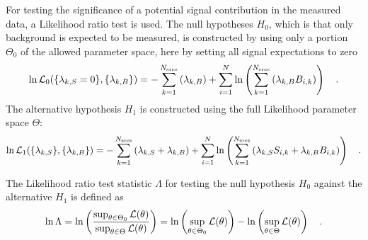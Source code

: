 For testing the significance of a potential signal contribution in the measured data, a Likelihood ratio test is used.
The null hypotheses $H_0$, which is that only background is expected to be measured, is constructed by using only a portion $\Theta_0$ of the allowed parameter space, here by setting all signal expectations to zero
\begin{equation}
  \ln\mathcal{L}_0(\{\lambda_{k,S}=0\}, \{\lambda_{k,B}\})
  = -\sum_{k=1}^{N_\text{srcs}}\left(\lambda_{k,B}\right) +
    \sum_{i=1}^N \ln\left(\sum_{k=1}^{N_\text{srcs}}\left(
      \lambda_{k,B} B_{i,k}\right)\right)
  \quad\text{.}
\end{equation}
The alternative hypothesis $H_1$ is constructed using the full Likelihood parameter space $\Theta$:
\begin{equation}
  \ln\mathcal{L}_1(\{\lambda_{k,S}\}, \{\lambda_{k,B}\})
  = -\sum_{k=1}^{N_\text{srcs}}\left(\lambda_{k,S}+
                                     \lambda_{k,B}\right) +
    \sum_{i=1}^N \ln\left(\sum_{k=1}^{N_\text{srcs}}\left(
      \lambda_{k,S} S_{i,k}+\lambda_{k,B} B_{i,k}\right)\right)
  \quad\text{.}
\end{equation}

The Likelihood ratio test statistic $\Lambda$ for testing the null hypothesis $H_0$ against the alternative $H_1$ is defined as 
\begin{equation}
  \ln\Lambda = \ln\left(\frac{\sup_{\theta \in \Theta_0} \mathcal{L}(\theta)}
                          {\sup_{\theta \in \Theta} \mathcal{L}(\theta)}\right)
  = \ln\left(\sup_{\theta \in \Theta_0} \mathcal{L}(\theta)\right) -
    \ln\left(\sup_{\theta \in \Theta} \mathcal{L}(\theta)\right)
  \quad\text{.}
\end{equation}

